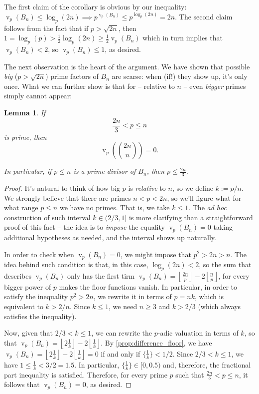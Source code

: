\documentclass[11pt]{article}
\newtheorem{lemma}[theorem]{Lemma}
\theoremstyle{remark}
\newcommand{\floor}[1]{\left\lfloor #1 \right\rfloor}
\newcommand{\vs}{\vspace{10px}}
\DeclareMathOperator{\val}{v}
\DeclareMathOperator{\vv}{v}
\begin{document}
The first claim of the corollary is obvious by our inequality: $\val_p(B_n)\le \log_p(2n)\implies p^{\vv_p(B_n)}\le p^{\log_p(2n)}= 2n$. The second claim follows from the fact that if $p>\sqrt{2n}$, then $1 = \log_p(p) >\frac{1}{2}\log_p(2n)\ge \frac{1}{2}\val_p(B_n)$ which in turn implies that $\val_p(B_n)<2$, so $\val_p(B_n)\le 1$, as desired.
\vs

The next observation is the heart of the argument. We have shown that possible \textit{big} ($p>\sqrt{2n}$) prime factors of $B_n$ are scarse: when (if!) they show up, it's only once. What we can further show is that for -- relative to $n$ -- even \textit{bigger} primes simply cannot appear:

\begin{lemma} \label{lemma:threshold_no_primes_in_bn}
If
\[
\frac{2n}{3}<p\leq n
\]
is prime, then
\[
\val_p\!\left(\binom{2n}{n}\right)=0.
\]

In particular, if $p\le n$ is a prime divisor of $B_n$, then $p\le \frac{2n}3$. 
\end{lemma}

\begin{proof}

It's natural to think of how big $p$ is \textit{relative} to $n$, so we define $k:= p/n$. We strongly believe that there are primes $n < p < 2n$, so we'll figure what for what range $p\le n$ we have no primes. That is, we take $k\le 1$. The \textit{ad hoc} construction of such interval $k\in (2/3, 1]$ is more clarifying than a straightforward proof of this fact -- the idea is to \textit{impose} the equality $\val_p(B_n)= 0$ taking additional hypotheses as needed, and the interval shows up naturally.
\vs

In order to check when $\val_p(B_n)=0$, we might impose that $p^2>2n>n$. The idea behind such condition is that, in this case, $\log_p(2n)< 2$, so the sum that describes $\val_p(B_n)$ only has the first tirm $\val_p(B_n) = \floor{\frac{2n}{p}}-2\floor{\frac{n}{p}}$, for every bigger power of $p$ makes the floor functions vanish. In particular, in order to satisfy the inequality $p^2>2n$, we rewrite it in terms of $p=nk$, which is equivalent to $k>2/n$. Since $k\le 1$, we need $n\ge 3$ and $k>2/3$ (which always satisfies the inequality).
\vs

Now, given that $2/3<k\le 1$, we can rewrite the $p$-adic valuation in terms of $k$, so that $\val_p(B_n)=\floor{2\frac 1k}-2\floor{\frac 1k}$. By \ref{prop:difference_floor}, we have $\val_p(B_n)=\floor{2\frac1k}-2\floor{\frac1k}= 0$ if and only if $\{\frac1k\}<1/2$. Since $2/3<k\le 1$, we have $1\le \frac1k<3/2 = 1.5$. In particular, $\{\frac 1k\}\in [0,0.5)$ and, therefore, the fractional part inequality is satisfied. Therefore, for every prime $p$ such that $\frac{2n}3<p\le n$, it follows that $\val_p(B_n) = 0$, as desired.
\end{proof}
\vs
\end{document}
